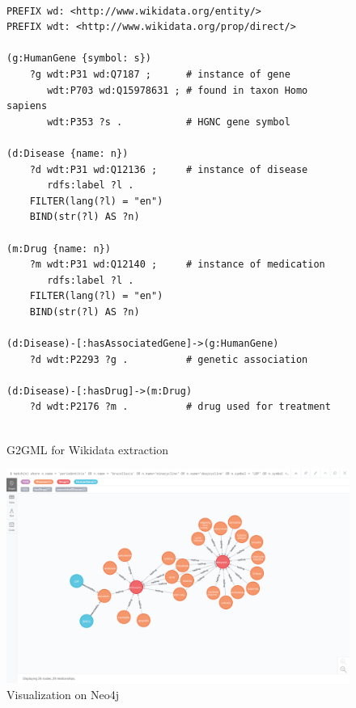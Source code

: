 \documentclass[runningheads]{llncs}
\begin{document}
\begin{figure}[!t]
\vspace{2mm}
\begin{scriptsize}
\begin{verbatim}
 
PREFIX wd: <http://www.wikidata.org/entity/>
PREFIX wdt: <http://www.wikidata.org/prop/direct/>
 
(g:HumanGene {symbol: s})
    ?g wdt:P31 wd:Q7187 ;      # instance of gene
       wdt:P703 wd:Q15978631 ; # found in taxon Homo sapiens
       wdt:P353 ?s .           # HGNC gene symbol
 
(d:Disease {name: n})
    ?d wdt:P31 wd:Q12136 ;     # instance of disease
       rdfs:label ?l .
    FILTER(lang(?l) = "en")
    BIND(str(?l) AS ?n)
 
(m:Drug {name: n})
    ?m wdt:P31 wd:Q12140 ;     # instance of medication
       rdfs:label ?l .
    FILTER(lang(?l) = "en")
    BIND(str(?l) AS ?n)
 
(d:Disease)-[:hasAssociatedGene]->(g:HumanGene)
    ?d wdt:P2293 ?g .          # genetic association
 
(d:Disease)-[:hasDrug]->(m:Drug)
    ?d wdt:P2176 ?m .          # drug used for treatment
 
\end{verbatim}
\end{scriptsize}
\caption{G2GML for Wikidata extraction}
\label{fig:g2gml_wikidata}
\end{figure}
 
\begin{figure}
\center
\includegraphics[width=1.0\textwidth]{neo4jexample2.png}
\caption{Visualization on Neo4j}
\label{fig:neo4jexample2.png}
\end{figure}
 
\end{document}
